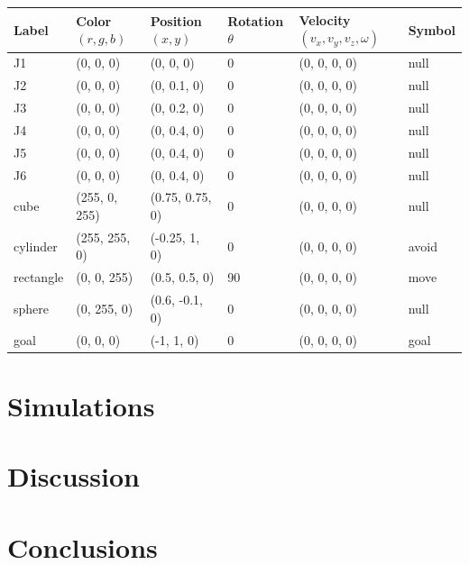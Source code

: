 \documentclass[doublespace,draft,nopageskip]{VTthesis} %
\begin{document}
 	\begin{tiny}
		\begin{center}
			\begin{tabular}{ | m{1cm} | m{1.75cm}| m{2cm} | m{1.5cm} | m{3cm} | m{1cm} | }
				\hline
				\textbf{Label} & \textbf{Color $(r, g, b)$} & \textbf{Position $(x,y)$} & \textbf{Rotation $\theta$} & \textbf{Velocity $(v_x, v_y, v_z, \omega)$} & \textbf{Symbol} \\
				\hline
				J1 & (0, 0, 0) & (0, 0, 0) & 0\textdegree & (0, 0, 0, 0) & null \\ 
				\hline
				J2 & (0, 0, 0) & (0, 0.1, 0) & 0\textdegree & (0, 0, 0, 0) & null\\ 
				\hline
				J3 & (0, 0, 0) & (0, 0.2, 0) & 0\textdegree & (0, 0, 0, 0) & null\\ 
				\hline
				J4 & (0, 0, 0) & (0, 0.4, 0) & 0\textdegree & (0, 0, 0, 0) & null\\ 
				\hline
				J5 & (0, 0, 0) & (0, 0.4, 0) & 0\textdegree & (0, 0, 0, 0) & null \\ 
				\hline
				J6 & (0, 0, 0) & (0, 0.4, 0) & 0\textdegree & (0, 0, 0, 0)& null \\ 
				\hline
				cube & (255, 0, 255) & (0.75, 0.75, 0) & 0\textdegree & (0, 0, 0, 0) & null\\ 
				\hline
				cylinder & (255, 255, 0) & (-0.25, 1, 0) & 0\textdegree & (0, 0, 0, 0) & avoid\\ 
				\hline
				rectangle & (0, 0, 255) & (0.5, 0.5, 0) & 90\textdegree & (0, 0, 0, 0) & move\\ 
				\hline
				sphere & (0, 255, 0) & (0.6, -0.1, 0) & 0\textdegree & (0, 0, 0, 0) & null\\ 
				\hline
				goal & (0, 0, 0) & (-1, 1, 0) & 0\textdegree & (0, 0, 0, 0) & goal\\ 
				\hline
			\end{tabular}
		\end{center}
	\end{tiny}
 

	\chapter{Simulations} \label{ch:simulations}

	\chapter{Discussion} \label{ch:discussion}
	\chapter{Conclusions} \label{ch:conclusions}

\end{document}
